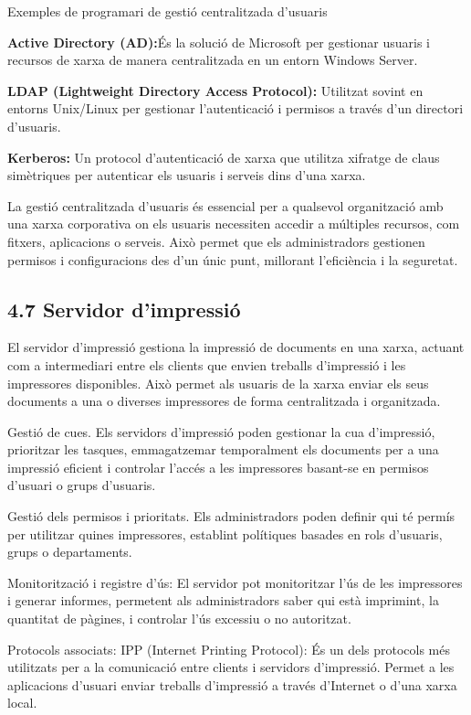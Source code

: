 \documentclass[
  a4paper,
]{article}
\begin{document}
Exemples de programari de gestió centralitzada d'usuaris

\textbf{Active Directory (AD):}És la solució de Microsoft per gestionar
usuaris i recursos de xarxa de manera centralitzada en un entorn Windows
Server.

\textbf{LDAP (Lightweight Directory Access Protocol):} Utilitzat sovint
en entorns Unix/Linux per gestionar l'autenticació i permisos a través
d'un directori d'usuaris.

\textbf{Kerberos:} Un protocol d'autenticació de xarxa que utilitza
xifratge de claus simètriques per autenticar els usuaris i serveis dins
d'una xarxa.

La gestió centralitzada d'usuaris és essencial per a qualsevol
organització amb una xarxa corporativa on els usuaris necessiten accedir
a múltiples recursos, com fitxers, aplicacions o serveis. Això permet
que els administradors gestionen permisos i configuracions des d'un únic
punt, millorant l'eficiència i la seguretat.

\subsection{4.7 Servidor d'impressió}\label{servidor-dimpressiuxf3}

El servidor d'impressió gestiona la impressió de documents en una xarxa,
actuant com a intermediari entre els clients que envien treballs
d'impressió i les impressores disponibles. Això permet als usuaris de la
xarxa enviar els seus documents a una o diverses impressores de forma
centralitzada i organitzada.

Gestió de cues. Els servidors d'impressió poden gestionar la cua
d'impressió, prioritzar les tasques, emmagatzemar temporalment els
documents per a una impressió eficient i controlar l'accés a les
impressores basant-se en permisos d'usuari o grups d'usuaris.

Gestió dels permisos i prioritats. Els administradors poden definir qui
té permís per utilitzar quines impressores, establint polítiques basades
en rols d'usuaris, grups o departaments.

Monitorització i registre d'ús: El servidor pot monitoritzar l'ús de les
impressores i generar informes, permetent als administradors saber qui
està imprimint, la quantitat de pàgines, i controlar l'ús excessiu o no
autoritzat.

Protocols associats: IPP (Internet Printing Protocol): És un dels
protocols més utilitzats per a la comunicació entre clients i servidors
d'impressió. Permet a les aplicacions d'usuari enviar treballs
d'impressió a través d'Internet o d'una xarxa local.
\end{document}
